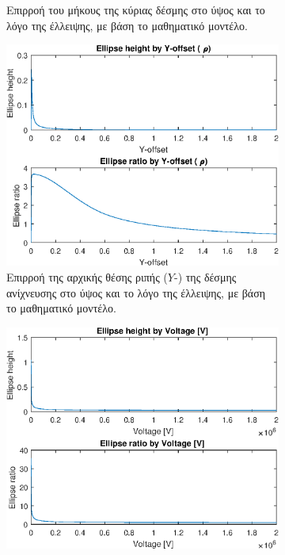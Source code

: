 \begin{figure}[tph]
\begin{subfigure}{0.47\textwidth}
		\centering
		\caption{Επιρροή του μήκους της κύριας δέσμης στο ύψος και το λόγο της έλλειψης, με βάση το μαθηματικό μοντέλο.}
		\label{fig:EBS-variables-length}
	\end{subfigure}
	\par\bigskip
	\begin{subfigure}{0.47\textwidth}
		\includegraphics[width=\linewidth]{figures/MATLAB-variable-analysis/EBS-variables-rho}
		\centering
		\caption{Επιρροή της αρχικής θέσης ριπής ($Y$-) της δέσμης ανίχνευσης στο ύψος και το λόγο της έλλειψης, με βάση το μαθηματικό μοντέλο.}
		\label{fig:EBS-variables-rho}
	\end{subfigure}
	\hfill
	\begin{subfigure}{0.47\textwidth}
		\includegraphics[width=\linewidth]{figures/MATLAB-variable-analysis/EBS-variables-voltage-linear}

\end{subfigure}
\end{figure}

